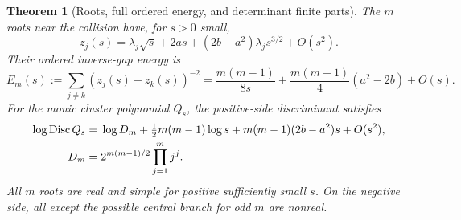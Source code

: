 \documentclass[11pt,a4paper]{article}
\newtheorem{theorem}{Theorem}[section]\newtheorem{proposition}[theorem]{Proposition}\newtheorem{lemma}[theorem]{Lemma}\newtheorem{corollary}[theorem]{Corollary}
\theoremstyle{definition}\newtheorem{definition}[theorem]{Definition}\newtheorem{remark}[theorem]{Remark}
\begin{document}
\begin{theorem}[Roots, full ordered energy, and determinant finite parts]
The $m$ roots near the collision have, for $s>0$ small,
\begin{equation}
 z_j(s)=\lambda_j\sqrt{s}+2as+(2b-a^2)\lambda_j s^{3/2}+O(s^2).
                                                        \label{eq:rootexpansion}
\end{equation}
Their ordered inverse-gap energy is
\begin{equation}
 \boxed{E_m(s):=\sum_{j\ne k}(z_j(s)-z_k(s))^{-2}
 =\frac{m(m-1)}{8s}+\frac{m(m-1)}4(a^2-2b)+O(s).}       \label{eq:energyfinite}
\end{equation}
For the monic cluster polynomial $Q_s$, the positive-side discriminant satisfies
\begin{align}
 \log\operatorname{Disc} Q_s={}&\log D_m+\tfrac12m(m-1)\log s
                  +m(m-1)(2b-a^2)s+O(s^2),\notag\\
 D_m={}&2^{m(m-1)/2}\prod_{j=1}^m j^j.                  \label{eq:discfinite}
\end{align}
All $m$ roots are real and simple for positive sufficiently small $s$. On the negative side, all except the possible central branch for odd $m$ are nonreal.
\end{theorem}
\end{document}
